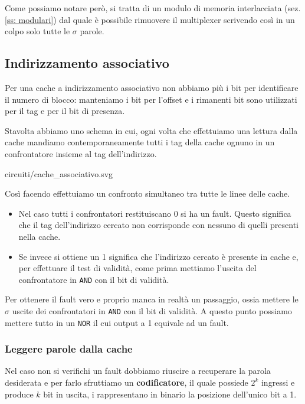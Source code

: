 Come possiamo notare però, si tratta di un modulo di memoria interlacciata (sez. \ref{ss: modulari})
dal quale è possibile rimuovere il multiplexer scrivendo così in un colpo solo tutte le $\sigma$
parole.

\subsection{Indirizzamento associativo}
Per una cache a indirizzamento associativo non abbiamo più i bit per identificare il numero di
blocco: manteniamo i bit per l'offset e i rimanenti bit sono utilizzati per il tag e per il bit
di presenza.

Stavolta abbiamo uno schema in cui, ogni volta che effettuiamo una lettura dalla cache mandiamo
contemporaneamente tutti i tag della cache ognuno in un confrontatore insieme al tag dell'indirizzo.
\begin{center}
	 {circuiti/cache_associativo.svg}
\end{center}
Così facendo effettuiamo un confronto simultaneo tra tutte le linee delle cache.
\begin{itemize}
	\item Nel caso tutti i confrontatori restituiscano 0 si ha un fault. Questo significa che
	      il tag dell'indirizzo cercato non corrisponde con nessuno di quelli presenti nella cache.
	\item Se invece si ottiene un 1 significa che l'indirizzo cercato è presente in cache e, per
	      effettuare il test di validità, come prima mettiamo l'uscita del confrontatore in
	      \verb|AND| con il bit di validità.
\end{itemize}
Per ottenere il fault vero e proprio manca in realtà un passaggio, ossia mettere le $\sigma$ uscite
dei confrontatori in \verb|AND| con il bit di validità. A questo punto possiamo mettere tutto in un
\verb|NOR| il cui output a 1 equivale ad un fault.

\subsubsection{Leggere parole dalla cache}
Nel caso non si verifichi un fault dobbiamo riuscire a recuperare la parola desiderata e per farlo
sfruttiamo un \textbf{codificatore}, il quale possiede $2^k$ ingressi e produce $k$ bit in uscita,
i rappresentano in binario la posizione dell'unico bit a 1.